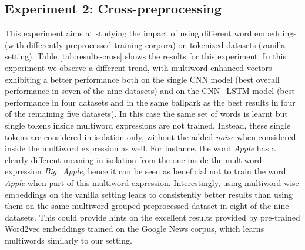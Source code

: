 \documentclass[11pt,a4paper]{article}
\begin{document}
\begin{table*}[t]
\begin{center}
{\begin{tabular}{c l c  c  c  c c c c c c}
       






       




       \bottomrule
       
    \end{tabular}
    }
    \end{center}
    \caption{Cross-preprocessing evaluation: accuracy on the topic categorization and polarity detection tasks using different sets of word embeddings to initialize the embedding layer of the two classifiers. All datasets were preprocessed similarly according to the vanilla setting. $^\dagger$ indicates results that are statistically significant with respect to the top result. }
    \label{tab:results-cross}
\end{table*}










\subsection{Experiment 2: Cross-preprocessing}
\label{experiment2}

This experiment aims at studying the impact of using different word embeddings (with differently preprocessed training corpora) on tokenized datasets (vanilla setting). Table \ref{tab:results-cross} shows the results for this experiment. 
In this experiment we observe a different trend, with multiword-enhanced vectors exhibiting a better performance both on the single CNN model (best overall performance in seven of the nine datasets) and on the CNN+LSTM model (best performance in four datasets and in the same ballpark as the best results in four of the remaining five datasets).
In this case the same set of words is learnt but single tokens inside multiword expressions are not trained. Instead, these single tokens are considered in isolation only, without the added \textit{noise} when considered inside the multiword expression as well. For instance, the word \textit{Apple} has a clearly different meaning in isolation from the one inside the multiword expression \textit{Big\_Apple}, hence it can be seen as beneficial not to train the word \textit{Apple} when part of this multiword expression. Interestingly, using multiword-wise embeddings on the vanilla setting leads to consistently better results than using them on the same multiword-grouped preprocessed dataset in eight of the nine datasets. This could provide hints on the excellent results provided by pre-trained Word2vec embeddings trained on the Google News corpus, which learns multiwords similarly to our setting.
\end{document}
